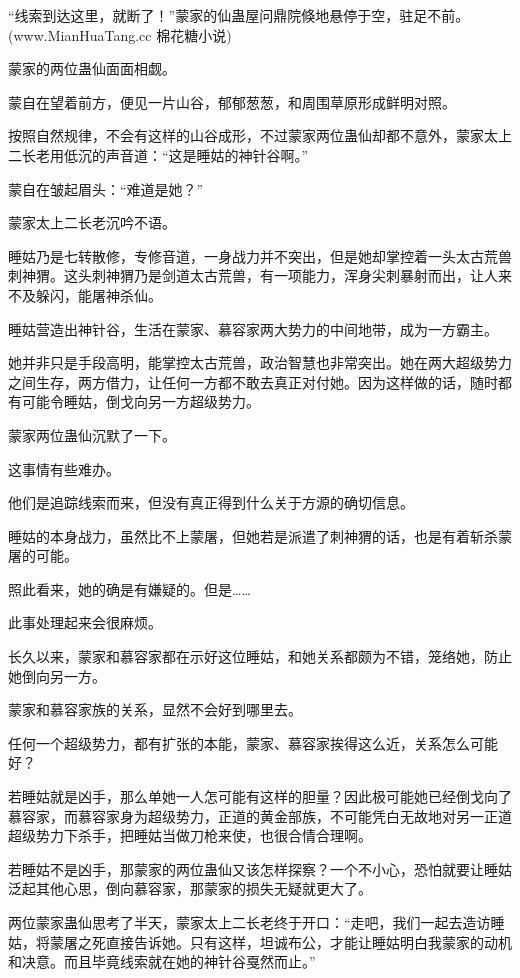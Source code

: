 
\begin{this_body}

“线索到达这里，就断了！”蒙家的仙蛊屋问鼎院倏地悬停于空，驻足不前。(www.MianHuaTang.cc 棉花糖小说)

蒙家的两位蛊仙面面相觑。

蒙自在望着前方，便见一片山谷，郁郁葱葱，和周围草原形成鲜明对照。

按照自然规律，不会有这样的山谷成形，不过蒙家两位蛊仙却都不意外，蒙家太上二长老用低沉的声音道：“这是睡姑的神针谷啊。”

蒙自在皱起眉头：“难道是她？”

蒙家太上二长老沉吟不语。

睡姑乃是七转散修，专修音道，一身战力并不突出，但是她却掌控着一头太古荒兽刺神猬。这头刺神猬乃是剑道太古荒兽，有一项能力，浑身尖刺暴射而出，让人来不及躲闪，能屠神杀仙。

睡姑营造出神针谷，生活在蒙家、慕容家两大势力的中间地带，成为一方霸主。

她并非只是手段高明，能掌控太古荒兽，政治智慧也非常突出。她在两大超级势力之间生存，两方借力，让任何一方都不敢去真正对付她。因为这样做的话，随时都有可能令睡姑，倒戈向另一方超级势力。

蒙家两位蛊仙沉默了一下。

这事情有些难办。

他们是追踪线索而来，但没有真正得到什么关于方源的确切信息。

睡姑的本身战力，虽然比不上蒙屠，但她若是派遣了刺神猬的话，也是有着斩杀蒙屠的可能。

照此看来，她的确是有嫌疑的。但是……

此事处理起来会很麻烦。

长久以来，蒙家和慕容家都在示好这位睡姑，和她关系都颇为不错，笼络她，防止她倒向另一方。

蒙家和慕容家族的关系，显然不会好到哪里去。

任何一个超级势力，都有扩张的本能，蒙家、慕容家挨得这么近，关系怎么可能好？

若睡姑就是凶手，那么单她一人怎可能有这样的胆量？因此极可能她已经倒戈向了慕容家，而慕容家身为超级势力，正道的黄金部族，不可能凭白无故地对另一正道超级势力下杀手，把睡姑当做刀枪来使，也很合情合理啊。

若睡姑不是凶手，那蒙家的两位蛊仙又该怎样探察？一个不小心，恐怕就要让睡姑泛起其他心思，倒向慕容家，那蒙家的损失无疑就更大了。

两位蒙家蛊仙思考了半天，蒙家太上二长老终于开口：“走吧，我们一起去造访睡姑，将蒙屠之死直接告诉她。只有这样，坦诚布公，才能让睡姑明白我蒙家的动机和决意。而且毕竟线索就在她的神针谷戛然而止。”


\end{this_body}
